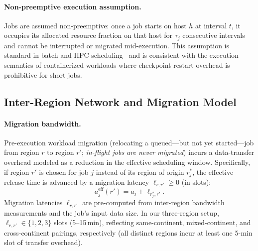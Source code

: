 \documentclass[a4paper,fleqn]{cas-dc}
\begin{document}
\paragraph{Non-preemptive execution assumption.}
Jobs are assumed non-preemptive: once a job starts on host $h$ at interval $t$, it occupies its allocated resource fraction on that host for $\tau_j$ consecutive intervals and cannot be interrupted or migrated mid-execution. This assumption is standard in batch and HPC scheduling~\cite{ref-kocot23} and is consistent with the execution semantics of containerized workloads where checkpoint-restart overhead is prohibitive for short jobs.

\subsection{Inter-Region Network and Migration Model}
\label{sec:network}

\paragraph{Migration bandwidth.}
Pre-execution workload migration (relocating a queued---but not yet started---job from region $r$ to region $r'$; \emph{in-flight jobs are never migrated}) incurs a data-transfer overhead modeled as a reduction in the effective scheduling window. Specifically, if region $r'$ is chosen for job $j$ instead of its region of origin $r^*_j$, the effective release time is advanced by a migration latency $\ell_{r,r'} \geq 0$ (in slots):
\begin{equation}
\label{eq:eff_release}
a^{\mathrm{eff}}_j(r') = a_j + \ell_{r^*_j, r'}.
\end{equation}
Migration latencies $\ell_{r,r'}$ are pre-computed from inter-region bandwidth measurements and the job's input data size. In our three-region setup, $\ell_{r,r'} \in \{1, 2, 3\}$ slots (5--15\,min), reflecting same-continent, mixed-continent, and cross-continent pairings, respectively (all distinct regions incur at least one 5-min slot of transfer overhead).
\end{document}
